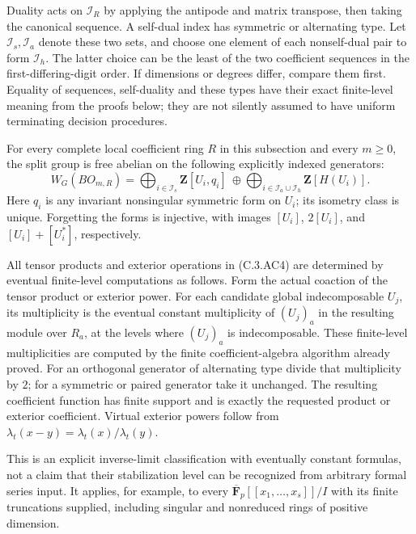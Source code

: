 Duality acts on $\mathscr I_R$ by applying the antipode and
matrix transpose, then taking the canonical sequence.  A
self-dual index has symmetric or alternating type.  Let
$\mathscr I_s,\mathscr I_a$ denote these two sets, and choose
one element of each nonself-dual pair to form $\mathscr I_h$.
The latter choice can be the least of the two coefficient
sequences in the first-differing-digit order.  If dimensions
or degrees differ, compare them first.  Equality of sequences,
self-duality and these types have their exact finite-level
meaning from the proofs below; they are not silently assumed
to have uniform terminating decision procedures.

\begin{theorem}
\label{C:complete_algclosed_WG}
For every complete local coefficient ring $R$ in this
subsection and every $m\geq0$, the split group is free abelian
on the following explicitly indexed generators:
\[
 W_G(BO_{m,R})=
   \bigoplus_{i\in\mathscr I_s}\mathbf Z[U_i,q_i]
   \ \oplus\!
   \bigoplus_{i\in\mathscr I_a\cup\mathscr I_h}
                         \mathbf Z[H(U_i)].             \tag{C.3.AC4}
\]
Here $q_i$ is any invariant nonsingular symmetric form on
$U_i$; its isometry class is unique.  Forgetting the forms
is injective, with images $[U_i]$, $2[U_i]$, and
$[U_i]+[U_i^*]$, respectively.

All tensor products and exterior operations in (C.3.AC4)
are determined by eventual finite-level computations as
follows.  Form the actual coaction of the tensor product or
exterior power.  For each candidate global indecomposable
$U_j$, its multiplicity is the eventual constant multiplicity
of $(U_j)_a$ in the resulting module over $R_a$, at the
levels where $(U_j)_a$ is indecomposable.  These finite-level
multiplicities are computed by the finite coefficient-algebra
algorithm already proved.  For an orthogonal generator of
alternating type divide that multiplicity by $2$; for a
symmetric or paired generator take it unchanged.  The
resulting coefficient function has finite support and is
exactly the requested product or exterior coefficient.
Virtual exterior powers follow from
$\lambda_t(x-y)=\lambda_t(x)/\lambda_t(y)$.

This is an explicit inverse-limit classification with
eventually constant formulas, not a claim that their
stabilization level can be recognized from arbitrary formal
series input.  It applies, for example, to every
$\overline{\mathbf F}_p[[x_1,\ldots,x_s]]/I$ with its
finite truncations supplied, including singular and
nonreduced rings of positive dimension.
\end{theorem}
